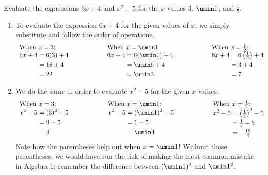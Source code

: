 \begin{boxedex}
\label{ex:evaluating}
Evaluate the expressions $6x+ 4$ and $x^2 - 5$ for the $x$ values 3, $\umin1$, and $\frac{1}{2}$.

\exsoln{}
\begin{enumerate}[label={(\alph*)}]
\item To evaluate the expression $6x + 4$ for the given values of $x$, we simply substitute and follow the order of operations.
\[
\begin{array}{lllll}
\text{When $x=3$:}
&
&
\text{When $x=\umin1$:}
&
&
\text{When $x=\frac{1}{2}$:}
\\ %
\begin{aligned}
6x + 4 & = 6(3) + 4\\
& = 18 + 4\\
& = 22
\end{aligned}
&
\qquad\qquad
&
\begin{aligned}
6x + 4 & = 6(\umin1) + 4\\
& = \umin6 + 4\\
& = \umin2
\end{aligned}
&
\qquad\qquad
&
\begin{aligned}
6x + 4 & = 6\left(\tfrac{1}{2}\right) + 4\\
& = 3 + 4\\
& = 7
\end{aligned}
\end{array}
\]

\item We do the same in order to evaluate $x^2 - 5$ for the given $x$ values.
\[
\begin{array}{lllll}
\text{When $x=3$:}
&
&
\text{When $x=\umin1$:}
&
&
\text{When $x=\frac{1}{2}$:}
\\ %
\begin{aligned}
x^2 - 5 & = (3)^2 - 5\\
& = 9 - 5\\
& = 4
\end{aligned}
&
\qquad\qquad
&
\begin{aligned}
x^2 - 5 & = (\umin1)^2 - 5\\
& = 1 - 5\\
& = \umin4
\end{aligned}
&
\qquad\qquad
&
\begin{aligned}
x^2 - 5 & = \left(\tfrac{1}{2}\right)^2 - 5\\
& = \tfrac{1}{4} - 5\\
& = -\tfrac{19}{4}
\end{aligned}
\end{array}
\]
Note how the parentheses help out when $x = \umin1$! Without those parentheses, we would have run the risk of making the most common mistake in Algebra 1: remember the difference between $(\umin1)^2$ and $\umin1^2$.
\end{enumerate}
\end{boxedex}

